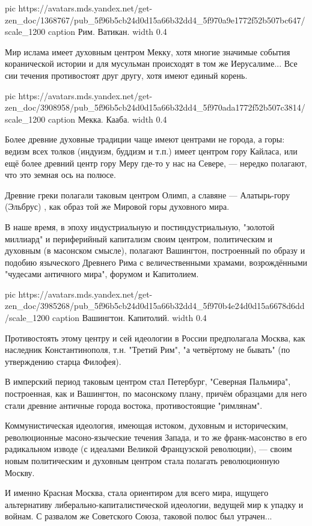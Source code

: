 \ifcmt
  pic https://avatars.mds.yandex.net/get-zen_doc/1368767/pub_5f96b5cb24d0d15a66b32dd4_5f970a9e1772f52b507bc647/scale_1200
  caption Рим. Ватикан.
  width 0.4
\fi

Мир ислама имеет духовным центром Мекку, хотя многие значимые события
коранической истории и для мусульман происходят в том же Иерусалиме... Все сии
течения противостоят друг другу, хотя имеют единый корень.

\ifcmt
  pic https://avatars.mds.yandex.net/get-zen_doc/3908958/pub_5f96b5cb24d0d15a66b32dd4_5f970ada1772f52b507c3814/scale_1200
  caption Мекка. Кааба.
  width 0.4
\fi

Более древние духовные традиции чаще имеют центрами не города, а горы: ведизм
всех толков (индуизм, буддизм и т.п.) имеет центром гору Кайласа, или ещё более
древний центр гору Меру где-то у нас на Севере, — нередко полагают, что это
земная ось на полюсе.

Древние греки полагали таковым центром Олимп, а славяне — Алатырь-гору
(Эльбрус) , как образ той же Мировой горы духовного мира.

В наше время, в эпоху индустриальную и постиндустриальную, "золотой миллиард" и
периферийный капитализм своим центром, политическим и духовным (в масонском
смысле), полагают Вашингтон, построенный по образу и подобию языческого
Древнего Рима с величественными храмами, возрождёнными "чудесами античного
мира", форумом и Капитолием. 

\ifcmt
  pic https://avatars.mds.yandex.net/get-zen_doc/3985268/pub_5f96b5cb24d0d15a66b32dd4_5f970b4e24d0d15a6678d6dd/scale_1200
  caption Вашингтон. Капитолий.
  width 0.4
\fi

Противостоять этому центру и сей идеологии в России предполагала Москва, как
наследник Константинополя, т.н. "Третий Рим", "а четвёртому не бывать" (по
утверждению старца Филофея).

В имперский период таковым центром стал Петербург, "Северная Пальмира",
построенная, как и Вашингтон, по масонскому плану, причём образцами для него
стали древние античные города востока, противостоящие "римлянам".

Коммунистическая идеология, имеющая истоком, духовным и историческим,
революционные масоно-языческие течения Запада, и то же франк-масонство в его
радикальном изводе (с идеалами Великой Французской революции), — своим новым
политическим и духовным центром стала полагать революционную Москву.

И именно Красная Москва, стала ориентиром для всего мира, ищущего альтернативу
либерально-капиталистической идеологии, ведущей мир к упадку и войнам. С
развалом же Советского Союза, таковой полюс был утрачен...

